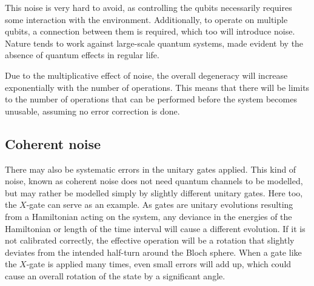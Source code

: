 This noise is very hard to avoid, as controlling the qubits necessarily requires some interaction with the environment.
Additionally, to operate on multiple qubits, a connection between them is required, which too will introduce noise.
Nature tends to work against large-scale quantum systems, made evident by the absence of quantum effects in regular life.

Due to the multiplicative effect of noise, the overall degeneracy will increase exponentially with the number of operations.
This means that there will be limits to the number of operations that can be performed before the system becomes unusable, assuming no error correction is done.

\subsection{Coherent noise}
There may also be systematic errors in the unitary gates applied.
This kind of noise, known as coherent noise does not need quantum channels to be modelled, but may rather be modelled simply by slightly different unitary gates.
Here too, the $X$-gate can serve as an example.
As gates are unitary evolutions resulting from a Hamiltonian acting on the system, any deviance in the energies of the Hamiltonian or length of the time interval will cause a different evolution.
If it is not calibrated correctly, the effective operation will be a rotation that slightly deviates from the intended half-turn around the Bloch sphere.
When a gate like the $X$-gate is applied many times, even small errors will add up, which could cause an overall rotation of the state by a significant angle.


